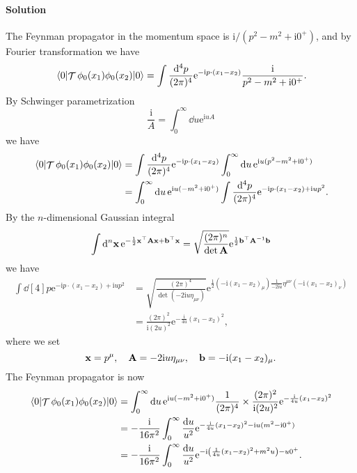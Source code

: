 \documentclass[hyperref, a4paper]{article}
\DeclareMathOperator{\timeorder}{\mathcal{T}}
\newcommand*{\ii}{\mathrm{i}}
\newcommand*{\ee}{\mathrm{e}}
\begin{document}
\paragraph{Solution} The Feynman propagator in the momentum space is $\ii / (p^2 - m^2 + \ii 0^+)$, and by Fourier transformation we have 
\begin{equation}
    \expval*{\timeorder\phi_0(x_1) \phi_0(x_2)}{0} = \int \frac{\dd[4]{p}}{(2\pi)^4} \ee^{- \ii p \cdot (x_1 - x_2)} \frac{\ii}{p^2 - m^2 + \ii 0^+} .
\end{equation}
By Schwinger parametrization 
\[
    \frac{\ii}{A} = \int_0^\infty \dd{u} \ee^{\ii u A}
\]
we have 
\[
    \begin{aligned}
        \expval*{\timeorder \phi_0(x_1) \phi_0(x_2)}{0}& = \int \frac{\dd[4]{p}}{(2\pi)^4} \ee^{- \ii p \cdot (x_1 - x_2)} \int_0^\infty \dd{u} \ee^{\ii u (p^2 - m^2 + \ii 0^+)} \\
        &= \int_0^\infty \dd{u} \ee^{\ii u (- m^2 + \ii 0^+)} \int \frac{\dd[4]{p}}{(2\pi)^4} \ee^{- \ii p \cdot (x_1 - x_2) + \ii u p^2}.
    \end{aligned}
\]
By the $n$-dimensional Gaussian integral 
\[
    \int \dd[n]{\vb{x}} \ee^{- \frac{1}{2} \vb{x}^\top \vb{A} \vb{x} + \vb{b}^\top \vb{x}} = \sqrt{\frac{(2\pi)^n}{\det \vb{A}}} \ee^{\frac{1}{2} \vb{b}^\top \vb{A}^{-1} \vb{b}}
\]
we have 
\[
    \begin{aligned}
        \int \dd[4]{p} \ee^{- \ii p \cdot (x_1 - x_2) + \ii u p^2} 
        &= \sqrt{\frac{(2\pi)^4}{\det(- 2 \ii u \eta_{\mu \nu})}} \ee^{\frac{1}{2} (- \ii (x_1 - x_2)_\mu) \frac{1}{- 2 \ii u} \eta^{\mu \nu} (- \ii (x_1 - x_2)_\nu)} \\
        &= \frac{ (2\pi)^2 }{\ii (2u)^2} \ee^{- \frac{\ii}{4u} (x_1 - x_2)^2},
    \end{aligned}
\]
where we set
\[
    \vb{x} = p^\mu, \quad \vb{A} = - 2 \ii u \eta_{\mu \nu}, \quad \vb{b} = - \ii (x_1 - x_2)_\mu.
\]
The Feynman propagator is now 
\[
    \begin{aligned}
        \expval*{\timeorder \phi_0(x_1) \phi_0(x_2)}{0} &= \int_0^\infty \dd{u} \ee^{\ii u (- m^2 + \ii 0^+)} \frac{1}{(2\pi)^4} \times 
        \frac{ (2\pi)^2 }{\ii (2u)^2} \ee^{- \frac{\ii}{4u} (x_1 - x_2)^2} \\
        &= - \frac{\ii}{16 \pi^2} \int_0^\infty \frac{\dd{u}}{u^2} \ee^{- \frac{\ii}{4u} (x_1 - x_2)^2 - \ii u (m^2 - \ii 0^+)} \\
        &= - \frac{\ii}{16 \pi^2} \int_0^\infty \frac{\dd{u}}{u^2} \ee^{- \ii \left( \frac{1}{4u} (x_1 - x_2)^2 + m^2 u \right) - u 0^+}.
    \end{aligned}
\]
\end{document}
